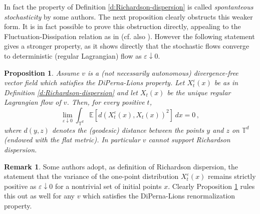 \documentclass[11pt,reqno]{amsart}
\newtheorem{proposition}[theorem]{Proposition}
\theoremstyle{definition}
\newtheorem{remark}[theorem]{Remark}
\numberwithin{equation}{section}
\begin{document}
In fact the property of Definition \ref{d:Richardson-dispersion} is called {\em spontanteous stochasticity} by some authors. The next proposition clearly obstructs this weaker form. It is in fact possible to prove this obstruction directly, appealing to the Fluctuation-Dissipation relation as in \cite{Drivas} (cf. also \cite{JohanssonSorella2023}). However the following statement gives a stronger property, as it shows directly that the stochastic flows converge to deterministic (regular Lagrangian) flow as $\varepsilon \downarrow 0$.

\begin{proposition}\label{p:no-Richardson}
Assume $v$ is a (not necessarily autonomous) divergence-free vector field which satisfies the DiPerna-Lions property.  Let $X^\varepsilon_t (x)$ be as in Definition \ref{d:Richardson-dispersion} and let $X_t (x)$ be the unique regular Lagrangian flow of $v$. Then, for every positive $t$, 
\[
\lim_{\varepsilon\downarrow 0} \int_{\mathbb T^d} {\mathbb E} [ d (X^\varepsilon_t (x), X_t (x))^2]\, dx = 0\, ,
\]
where $d (y,z)$ denotes the (geodesic) distance between the points $y$ and $z$ on $\mathbb T^d$ (endowed with the flat metric). In particular $v$ cannot support Richardson dispersion.
\end{proposition}

\begin{remark}
Some authors adopt, as definition of Richardson dispersion, the statement that the variance of the one-point distribution $X^\varepsilon_t (x)$ remains strictly positive as $\varepsilon\downarrow 0$ for a nontrivial set of initial points $x$. Clearly Proposition \ref{p:no-Richardson} rules this out as well for any $v$ which satisfies the DiPerna-Lions renormalization property. 
\end{remark}
\end{document}
